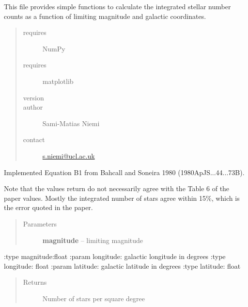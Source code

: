 \documentclass[a4paper,11pt,english]{sphinxmanual}
\begin{document}
\label{sources:module-sources.stellarNumberCounts}
This file provides simple functions to calculate the integrated stellar number counts
as a function of limiting magnitude and galactic coordinates.
\begin{quote}\begin{description}
\item[{requires}] \leavevmode
NumPy

\item[{requires}] \leavevmode
matplotlib

\item[{version}] 

\item[{author}] \leavevmode
Sami-Matias Niemi

\item[{contact}] \leavevmode
\href{mailto:s.niemi@ucl.ac.uk}{s.niemi@ucl.ac.uk}

\end{description}\end{quote}

\begin{fulllineitems}
\label{sources:sources.stellarNumberCounts.bahcallSoneira}
Implemented Equation B1 from Bahcall and Soneira 1980 (1980ApJS...44...73B).

Note that the values return do not necessarily agree with the Table 6 of the paper values.
Mostly the integrated number of stars agree within 15\%, which is the error quoted
in the paper.
\begin{quote}\begin{description}
\item[{Parameters}] \leavevmode
\textbf{magnitude} -- limiting magnitude

\end{description}\end{quote}

:type magnitude:float
:param longitude: galactic longitude in degrees
:type longitude: float
:param latitude: galactic latitude in degrees
:type latitude: float
\begin{quote}\begin{description}
\item[{Returns}] \leavevmode
Number of stars per square degree

\end{description}\end{quote}

\end{fulllineitems}
\end{document}
